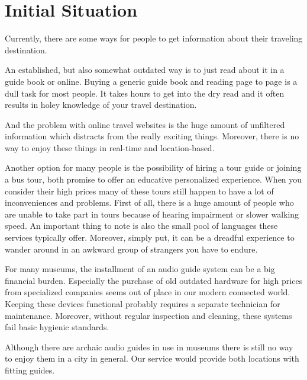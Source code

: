 \documentclass[12pt]{article}
\theoremstyle{definition}
\newenvironment{text}{
}{}
\begin{document}
\section{Initial Situation}
\begin{text}
Currently, there are some ways for people to get information about their traveling destination.\newline

An established, but also somewhat outdated way is to just read about it in a guide book or online.
Buying a generic guide book and reading page to page is a dull task for most people. It takes hours to get into the dry read and it often results in holey knowledge of your travel destination. \newline

And the problem with online travel websites is the huge amount of unfiltered information which distracts from the really exciting things. Moreover, there is no way to enjoy these things in real-time and location-based.\newline
 
Another option for many people is the possibility of hiring a tour guide or joining a bus tour, both promise to offer an educative personalized experience. 
When you consider their high prices many of these tours still happen to have a lot of inconveniences and problems. First of all, there is a huge amount of people who are unable to take part in tours because of hearing impairment or slower walking speed. An important thing to note is also the small pool of languages these services typically offer. Moreover, simply put, it can be a dreadful experience to wander around in an awkward group of strangers you have to endure.\newline
 
For many museums, the installment of an audio guide system can be a big financial burden. Especially the purchase of old outdated hardware for high prices from specialized companies seems out of place in our modern connected world. Keeping these devices functional probably requires a separate technician for maintenance.
Moreover, without regular inspection and cleaning, these systems fail basic hygienic standards. \newline

Although there are archaic audio guides in use in museums there is still no way to enjoy them in a city in general. Our service would provide both locations with fitting guides.
 
\end{text}
 
\end{document}
